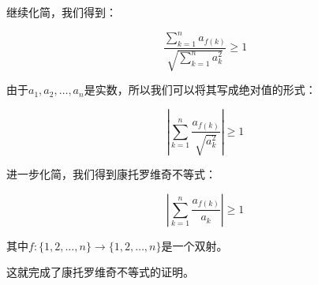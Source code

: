 \documentclass[UTF8]{ctexart}
\begin{document}
继续化简，我们得到：

\[
\frac{\sum_{k=1}^{n} a_{f(k)}}{\sqrt{\sum_{k=1}^{n} a_k^2}} \geq 1
\]

由于$a_1, a_2, \dots, a_n$是实数，所以我们可以将其写成绝对值的形式：

\[
\left| \sum_{k=1}^{n} \frac{a_{f(k)}}{\sqrt{a_k^2}} \right| \geq 1
\]

进一步化简，我们得到康托罗维奇不等式：

\[
\left| \sum_{k=1}^{n} \frac{a_{f(k)}}{a_k} \right| \geq 1
\]

其中$f:\{1,2,\dots,n\} \rightarrow \{1,2,\dots,n\}$是一个双射。

这就完成了康托罗维奇不等式的证明。
\end{document}
